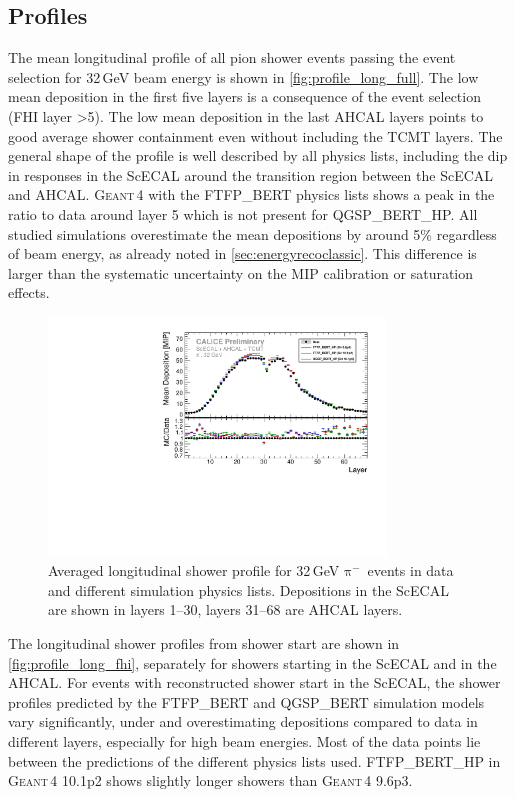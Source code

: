 \documentclass[twoside,a4paper,12pt]{article}
\newcommand\piminus{\(\mathrm{\pi^-}\)}
\newcommand\geant{\textsc{Geant\,4}\xspace}
\begin{document}
\subsection{Profiles}\label{sec:profiles}
The mean longitudinal profile of all pion shower events passing the event selection for 32\,GeV beam energy is shown in \autoref{fig:profile_long_full}. The low mean deposition in the first five layers is a consequence of the event selection (FHI layer \textgreater 5). The low mean deposition in the last AHCAL layers points to good average shower containment even without including the TCMT layers. The general shape of the profile is well described by all physics lists, including the dip in responses in the ScECAL around the transition region between the ScECAL and AHCAL. \geant with the FTFP\_BERT physics lists shows a peak in the ratio to data around layer 5 which is not present for QGSP\_BERT\_HP. All studied simulations overestimate the mean depositions by around 5\% regardless of beam energy, as already noted in \autoref{sec:energyrecoclassic}. This difference is larger than the systematic uncertainty on the MIP calibration or saturation effects.
\begin{figure}[htbp]
\begin{center}
\includegraphics[width=0.8\textwidth]{fig/pion/results/out_profileLongitudinal_560474.pdf}
\caption{Averaged longitudinal shower profile for 32\,GeV \piminus\ events in data and different simulation physics lists. Depositions in the ScECAL are shown in layers 1--30, layers 31--68 are AHCAL layers.}
\label{fig:profile_long_full}
\end{center}
\end{figure}

The longitudinal shower profiles from shower start are shown in \autoref{fig:profile_long_fhi}, separately for showers starting in the ScECAL and in the AHCAL. For events with reconstructed shower start in the ScECAL, the shower profiles predicted by the FTFP\_BERT and QGSP\_BERT simulation models vary significantly, under and overestimating depositions compared to data in different layers, especially for high beam energies. Most of the data points lie between the predictions of the different physics lists used. FTFP\_BERT\_HP in \geant 10.1p2 shows slightly longer showers than \geant 9.6p3.
\end{document}
